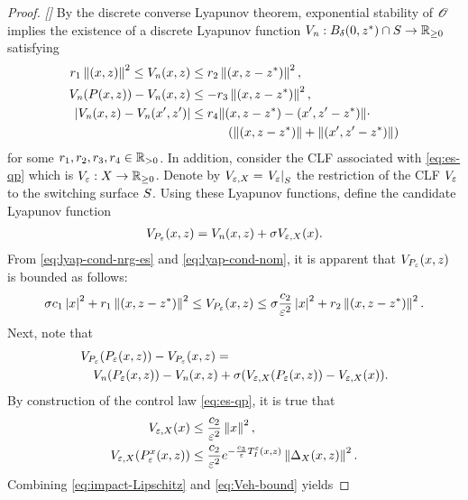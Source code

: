 \begin{proof}{\em []}
  By the discrete converse Lyapunov theorem, exponential stability of $\Orbit$ implies the existence of a discrete Lyapunov function $\Vn : B_{\delta}\xzst \cap \S \to \Rnn$ satisfying
  \begin{align}
    \label{eq:lyap-cond-nom}
    r_{1} \nzdxz^{2} \leq \Vn\argsxz &\leq r_{2} \nzdxzst^2,\\
    \nonumber
    \Vn(\P\argsxz) - \Vn\argsxz &\leq -r_{3} \nzdxzst^{2},\\
    \nonumber
    | \Vn\argsxz - \Vn(\zdx', \zdz') | &\leq
    r_{4} \| \argsxzst - \argsxzstprime \| \cdot\\
    \nonumber
    & \hspace{3em} (\nzdxzst + \nzdxzstprime)
  \end{align}
  for some $r_{1}, r_{2}, r_{3}, r_{4} \in \Rpd$.
  In addition, consider the CLF associated with \eqref{eq:es-qp} which is $\Ve : \zdX \to \Rnn$.
  Denote by $\Vex = \VeS$ the restriction of the CLF $\Ve$ to the switching surface $\S$.
  Using these Lyapunov functions, define the candidate Lyapunov function
  \begin{align}
    \VP\argsxz = \Vn\argsxz + \sigma \Vex(\zdx).
  \end{align}
  From \eqref{eq:lyap-cond-nrg-es} and \eqref{eq:lyap-cond-nom}, it is apparent that $\VP\argsxz$ is bounded as follows:
  \begin{align}
    \sigma c_{1} \nzdx^{2} + r_{1} \nzdxzst^{2} \leq \VP\argsxz \leq \sigma \frac{c_{2}}{\resclfparam^{2}} \nzdx^{2} + r_{2} \nzdxzst^{2}.
  \end{align}
  Next, note that
  \begin{align}
    \label{eq:composite-lyap}
    \lefteqn{\VP(\Pe\argsxz) - \VP\argsxz =}\\
    \nonumber
    &&\Vn(\Pe\argsxz) - \Vn\argsxz + \sigma(\Vex(\Pe\argsxz) - \Vex(\zdx)).
  \end{align}
  By construction of the control law \eqref{eq:es-qp}, it is true that
  \begin{align}
    \label{eq:Veh-bound}
    \Vex(\zdx) &\leq \frac{c_{2}}{\resclfparam^{2}} \left\| \zdx \right\|^{2},\\
    \nonumber
    \Vex(\Pe^{\zdx}\argsxz) &\leq \frac{c_{2}}{\resclfparam^{2}} e^{-\frac{c_{3}}{\resclfparam} \TIe\argsxz} \left\| \DeltaX\argsxz \right\|^{2}.
  \end{align}
  Combining \eqref{eq:impact-Lipschitz} and \eqref{eq:Veh-bound} yields

\end{proof}

